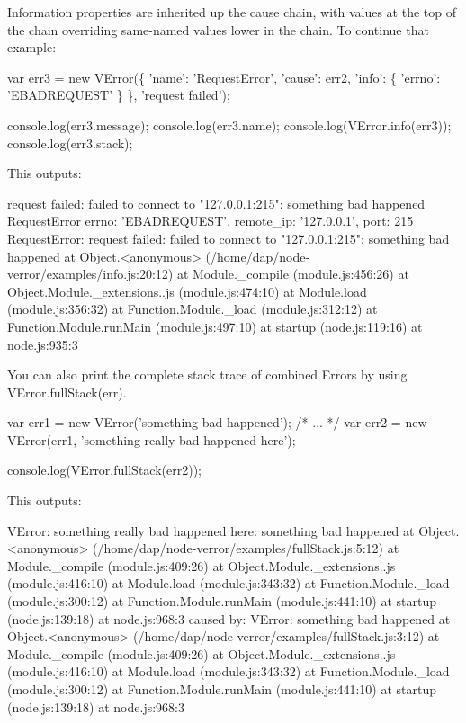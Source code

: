 Information properties are inherited up the cause chain, with values at the top of the chain overriding same-\/named values lower in the chain. To continue that example\+:


\begin{DoxyCode}
var err3 = new VError(\{
    'name': 'RequestError',
    'cause': err2,
    'info': \{
        'errno': 'EBADREQUEST'
    \}
\}, 'request failed');

console.log(err3.message);
console.log(err3.name);
console.log(VError.info(err3));
console.log(err3.stack);
\end{DoxyCode}


This outputs\+: \begin{DoxyVerb}request failed: failed to connect to "127.0.0.1:215": something bad happened
RequestError
{ errno: 'EBADREQUEST', remote_ip: '127.0.0.1', port: 215 }
RequestError: request failed: failed to connect to "127.0.0.1:215": something bad happened
    at Object.<anonymous> (/home/dap/node-verror/examples/info.js:20:12)
    at Module._compile (module.js:456:26)
    at Object.Module._extensions..js (module.js:474:10)
    at Module.load (module.js:356:32)
    at Function.Module._load (module.js:312:12)
    at Function.Module.runMain (module.js:497:10)
    at startup (node.js:119:16)
    at node.js:935:3
\end{DoxyVerb}


You can also print the complete stack trace of combined {\ttfamily Error}s by using {\ttfamily V\+Error.\+full\+Stack(err).}


\begin{DoxyCode}
var err1 = new VError('something bad happened');
/* ... */
var err2 = new VError(err1, 'something really bad happened here');

console.log(VError.fullStack(err2));
\end{DoxyCode}


This outputs\+: \begin{DoxyVerb}VError: something really bad happened here: something bad happened
    at Object.<anonymous> (/home/dap/node-verror/examples/fullStack.js:5:12)
    at Module._compile (module.js:409:26)
    at Object.Module._extensions..js (module.js:416:10)
    at Module.load (module.js:343:32)
    at Function.Module._load (module.js:300:12)
    at Function.Module.runMain (module.js:441:10)
    at startup (node.js:139:18)
    at node.js:968:3
caused by: VError: something bad happened
    at Object.<anonymous> (/home/dap/node-verror/examples/fullStack.js:3:12)
    at Module._compile (module.js:409:26)
    at Object.Module._extensions..js (module.js:416:10)
    at Module.load (module.js:343:32)
    at Function.Module._load (module.js:300:12)
    at Function.Module.runMain (module.js:441:10)
    at startup (node.js:139:18)
    at node.js:968:3
\end{DoxyVerb}


